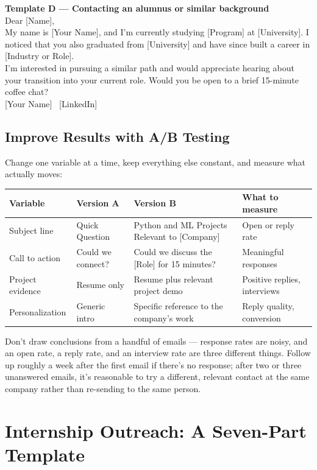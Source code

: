 \begin{template}
\textbf{Template D --- Contacting an alumnus or similar background}\\[4pt]
Dear [Name],\\[2pt]
My name is [Your Name], and I'm currently studying [Program] at [University]. I noticed that you also graduated
from [University] and have since built a career in [Industry or Role].\\[2pt]
I'm interested in pursuing a similar path and would appreciate hearing about your transition into your current
role. Would you be open to a brief 15-minute coffee chat?\\[2pt]
[Your Name] \textbar\ [LinkedIn]
\end{template}

\subsection{Improve Results with A/B Testing}

Change one variable at a time, keep everything else constant, and measure what actually moves:

\begin{longtable}{p{} p{} p{} p{}}
\toprule
\textbf{Variable} & \textbf{Version A} & \textbf{Version B} & \textbf{What to measure} \\
\midrule
\endhead
Subject line & Quick Question & Python and ML Projects Relevant to [Company] & Open or reply rate \\
Call to action & Could we connect? & Could we discuss the [Role] for 15 minutes? & Meaningful responses \\
Project evidence & Resume only & Resume plus relevant project demo & Positive replies, interviews \\
Personalization & Generic intro & Specific reference to the company's work & Reply quality, conversion \\
\bottomrule
\end{longtable}

Don't draw conclusions from a handful of emails — response rates are noisy, and an open rate, a reply rate, and
an interview rate are three different things. Follow up roughly a week after the first email if there's no
response; after two or three unanswered emails, it's reasonable to try a different, relevant contact at the same
company rather than re-sending to the same person.

\section{Internship Outreach: A Seven-Part Template}

